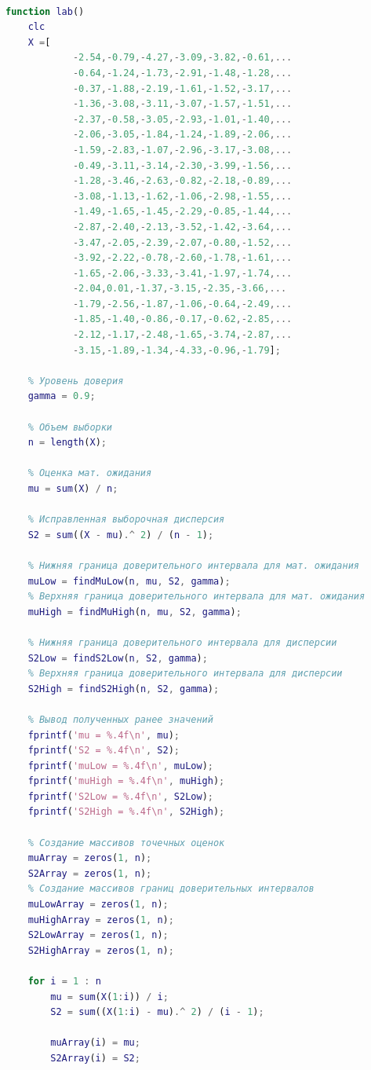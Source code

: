 \documentclass[12pt]{report}
\begin{document}
\begin{lstlisting}[language=Matlab]
% Вариант 11

function lab()
	clc
	X =[
			-2.54,-0.79,-4.27,-3.09,-3.82,-0.61,...
			-0.64,-1.24,-1.73,-2.91,-1.48,-1.28,...
			-0.37,-1.88,-2.19,-1.61,-1.52,-3.17,...
			-1.36,-3.08,-3.11,-3.07,-1.57,-1.51,...
			-2.37,-0.58,-3.05,-2.93,-1.01,-1.40,...
			-2.06,-3.05,-1.84,-1.24,-1.89,-2.06,...
			-1.59,-2.83,-1.07,-2.96,-3.17,-3.08,...
			-0.49,-3.11,-3.14,-2.30,-3.99,-1.56,...
			-1.28,-3.46,-2.63,-0.82,-2.18,-0.89,...
			-3.08,-1.13,-1.62,-1.06,-2.98,-1.55,...
			-1.49,-1.65,-1.45,-2.29,-0.85,-1.44,...
			-2.87,-2.40,-2.13,-3.52,-1.42,-3.64,...
			-3.47,-2.05,-2.39,-2.07,-0.80,-1.52,...
			-3.92,-2.22,-0.78,-2.60,-1.78,-1.61,...
			-1.65,-2.06,-3.33,-3.41,-1.97,-1.74,...
			-2.04,0.01,-1.37,-3.15,-2.35,-3.66,...
			-1.79,-2.56,-1.87,-1.06,-0.64,-2.49,...
			-1.85,-1.40,-0.86,-0.17,-0.62,-2.85,...
			-2.12,-1.17,-2.48,-1.65,-3.74,-2.87,...
			-3.15,-1.89,-1.34,-4.33,-0.96,-1.79];

	% Уровень доверия
	gamma = 0.9;

	% Объем выборки 
	n = length(X);

	% Оценка мат. ожидания 
	mu = sum(X) / n;
	
	% Исправленная выборочная дисперсия
	S2 = sum((X - mu).^ 2) / (n - 1);

	% Нижняя граница доверительного интервала для мат. ожидания
	muLow = findMuLow(n, mu, S2, gamma);
	% Верхняя граница доверительного интервала для мат. ожидания
	muHigh = findMuHigh(n, mu, S2, gamma);

	% Нижняя граница доверительного интервала для дисперсии
	S2Low = findS2Low(n, S2, gamma);
	% Верхняя граница доверительного интервала для дисперсии
	S2High = findS2High(n, S2, gamma);

	% Вывод полученных ранее значений
	fprintf('mu = %.4f\n', mu);
	fprintf('S2 = %.4f\n', S2);
	fprintf('muLow = %.4f\n', muLow);
	fprintf('muHigh = %.4f\n', muHigh);
	fprintf('S2Low = %.4f\n', S2Low);
	fprintf('S2High = %.4f\n', S2High);
	
	% Создание массивов точечных оценок
	muArray = zeros(1, n);
	S2Array = zeros(1, n);
	% Создание массивов границ доверительных интервалов
	muLowArray = zeros(1, n);
	muHighArray = zeros(1, n);
	S2LowArray = zeros(1, n);
	S2HighArray = zeros(1, n);
	
	for i = 1 : n
		mu = sum(X(1:i)) / i;
		S2 = sum((X(1:i) - mu).^ 2) / (i - 1);

		muArray(i) = mu;
		S2Array(i) = S2;
		

\end{lstlisting}
\end{document}
